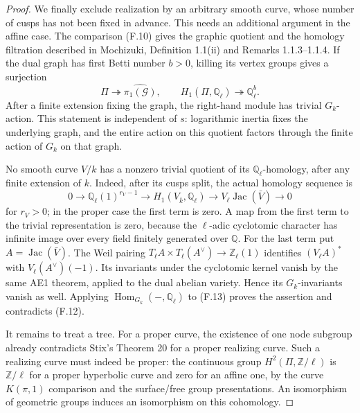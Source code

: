 \begin{proof}
We finally exclude realization by an arbitrary smooth curve,
whose number of cusps has not been fixed in advance. This needs
an additional argument in the affine case. The comparison (F.10)
gives the graphic quotient and the homology filtration described
in Mochizuki, Definition 1.1(ii) and Remarks 1.1.3--1.1.4.
If the dual graph has first Betti number $b>0$, killing its vertex
groups gives a surjection
\[
 \Pi\twoheadrightarrow\widehat{\pi_1(\mathcal G)},\qquad
 H_1(\Pi,\mathbb Q_\ell)\twoheadrightarrow\mathbb Q_\ell^b.
                                                               \tag{F.12}
\]
After a finite extension fixing the graph, the right-hand module
has trivial $G_k$-action. This statement is independent of $s$:
logarithmic inertia fixes the underlying graph, and the entire
action on this quotient factors through the finite action of
$G_k$ on that graph.

No smooth curve $V/k$ has a nonzero trivial quotient of its
$\mathbb Q_\ell$-homology, after any finite extension of $k$.
Indeed, after its cusps split, the actual homology sequence is
\[
 0\longrightarrow \mathbb Q_\ell(1)^{r_V-1}
 \longrightarrow H_1(V_{\bar k},\mathbb Q_\ell)
 \longrightarrow V_\ell\operatorname{Jac}(\bar V)
 \longrightarrow0                                             \tag{F.13}
\]
for $r_V>0$; in the proper case the first term is zero.
A map from the first term to the trivial representation is zero,
because the $\ell$-adic cyclotomic character has infinite image
over every field finitely generated over $\mathbb Q$.
For the last term put $A=\operatorname{Jac}(\bar V)$. The Weil
pairing $T_\ell A\times T_\ell(A^\vee)\to\mathbb Z_\ell(1)$
identifies $(V_\ell A)^*$ with $V_\ell(A^\vee)(-1)$. Its invariants
under the cyclotomic kernel vanish by the same AE1 theorem,
applied to the dual abelian variety. Hence its $G_k$-invariants
vanish as well. Applying $\operatorname{Hom}_{G_k}(-,\mathbb Q_\ell)$
to (F.13) proves the assertion and contradicts (F.12).

It remains to treat a tree. For a proper curve, the existence of
one node subgroup already contradicts Stix's Theorem 20 for a
proper realizing curve. Such a realizing curve must indeed be
proper: the continuous group $H^2(\Pi,\mathbb Z/\ell)$ is
$\mathbb Z/\ell$ for a proper hyperbolic curve and zero for an
affine one, by the curve $K(\pi,1)$ comparison and the surface/free
group presentations. An isomorphism of geometric groups induces
an isomorphism on this cohomology.


\end{proof}
